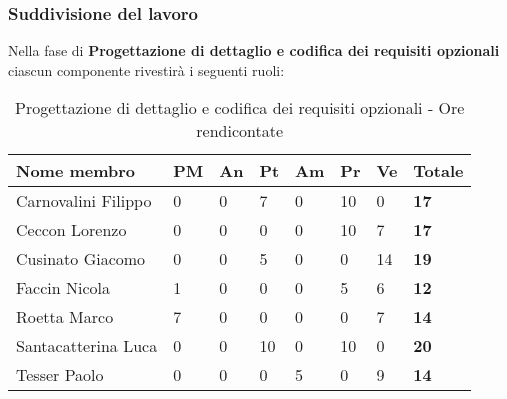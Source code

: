 		\subsubsection{Suddivisione del lavoro} %
		\label{ssub:suddivisione_del_lavoro}
		Nella fase di \textbf{Progettazione di dettaglio e codifica dei requisiti opzionali} ciascun componente rivestirà i seguenti ruoli: \\
			\begin{table}[!ht]
				\begin{center}
					\begin{tabularx}{0.9\textwidth}{|l|l|l|l|l|l|l|X|}
						\hline
						\textbf{Nome membro} & \textbf{PM} & \textbf{An} & \textbf{Pt} & \textbf{Am} & \textbf{Pr} & \textbf{Ve} & \textbf{Totale} \\
						\hline
						Carnovalini Filippo & 0 & 0 & 7 & 0 & 10 & 0 & \textbf{17} \\
						\hline
						Ceccon Lorenzo & 0 & 0 & 0 & 0 & 10 & 7 & \textbf{17} \\
						\hline
						Cusinato Giacomo & 0 & 0 & 5 & 0 & 0 & 14 & \textbf{19} \\
						\hline
						Faccin Nicola & 1 & 0 & 0 & 0 & 5 & 6 & \textbf{12} \\
						\hline
						Roetta Marco & 7 & 0 & 0 & 0 & 0 & 7 & \textbf{14} \\
						\hline
						Santacatterina Luca & 0 & 0 & 10 & 0 & 10 & 0 & \textbf{20} \\
						\hline
						Tesser Paolo & 0 & 0 & 0 & 5 & 0 & 9 & \textbf{14} \\
						\hline		
					\end{tabularx}
				\end{center}
			\caption{Progettazione di dettaglio e codifica dei requisiti opzionali - Ore rendicontate}
			\end{table}
			
